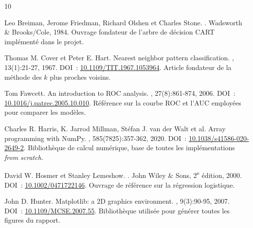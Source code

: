 \documentclass[11pt,a4paper]{article}
\begin{document}
\clearpage
{}
{}
\begin{thebibliography}{10}

Leo Breiman, Jerome Friedman, Richard Olshen et Charles Stone.
.
\newblock Wadsworth \& Brooks/Cole, 1984.
\newblock Ouvrage fondateur de l'arbre de décision CART implémenté dans le projet.

Thomas M. Cover et Peter E. Hart.
\newblock Nearest neighbor pattern classification.
, 13(1):21-27, 1967.
\newblock DOI~: \href{https://doi.org/10.1109/TIT.1967.1053964}{10.1109/TIT.1967.1053964}.
  Article fondateur de la méthode des $k$ plus proches voisins.

Tom Fawcett.
\newblock An introduction to {ROC} analysis.
, 27(8):861-874, 2006.
\newblock DOI~: \href{https://doi.org/10.1016/j.patrec.2005.10.010}{10.1016/j.patrec.2005.10.010}.
  Référence sur la courbe ROC et l'AUC employées pour comparer les modèles.

Charles R. Harris, K. Jarrod Millman, Stéfan J. van der Walt et al.
\newblock Array programming with {NumPy}.
, 585(7825):357-362, 2020.
\newblock DOI~: \href{https://doi.org/10.1038/s41586-020-2649-2}{10.1038/s41586-020-2649-2}.
  Bibliothèque de calcul numérique, base de toutes les implémentations \emph{from scratch}.

David W. Hosmer et Stanley Lemeshow.
.
\newblock John Wiley \& Sons, 2\textsuperscript{e} édition, 2000.
\newblock DOI~: \href{https://doi.org/10.1002/0471722146}{10.1002/0471722146}.
  Ouvrage de référence sur la régression logistique.

John D. Hunter.
\newblock Matplotlib: a 2{D} graphics environment.
, 9(3):90-95, 2007.
\newblock DOI~: \href{https://doi.org/10.1109/MCSE.2007.55}{10.1109/MCSE.2007.55}.
  Bibliothèque utilisée pour générer toutes les figures du rapport.


\end{thebibliography}
\end{document}
